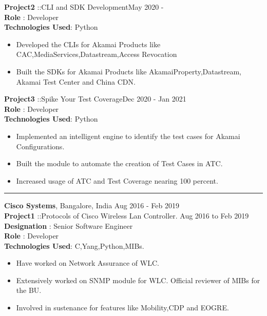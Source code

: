 \documentclass{resumeclass}
\begin{document}
\begin{resume}
  \textbf{Project2} ::CLI and SDK Development\hfill      May 2020 - \\
  \textbf{Role} : Developer \\
  \textbf{Technologies Used}: Python
  
   \begin{itemize} \itemsep -2pt
    \item Developed the CLIs for Akamai Products like CAC,MediaServices,Datastream,Access Revocation
    \item Built the SDKs for Akamai Products like AkamaiProperty,Datastream, Akamai Test Center and China CDN.
  \end{itemize} \vspace{-6pt}

  \textbf{Project3} ::Spike Your Test Coverage\hfill      Dec 2020 - Jan 2021\\
  \textbf{Role} : Developer \\
  \textbf{Technologies Used}: Python
  
   \begin{itemize} \itemsep -2pt
    \item Implemented an intelligent engine to identify the test cases for Akamai Configurations.
    \item Built the module to automate the creation of Test Cases in ATC.
    \item Increased usage of ATC and Test Coverage nearing 100 percent.
  \end{itemize} \vspace{-6pt}

\hfill   
\noindent\rule{20cm}{0.4pt}

{\large \textbf{Cisco Systems}, Bangalore, India} \hfill        Aug 2016 - Feb 2019 \\[0.5pt]

\textbf{Project1} ::Protocols of Cisco Wireless Lan Controller. \hfill      Aug 2016 to Feb 2019 \\
\textbf{Designation} : Senior Software Engineer \\
\textbf{Role} : Developer \\
\textbf{Technologies Used}: C,Yang,Python,MIBs.

 \begin{itemize} \itemsep -2pt
  \item Have worked on Network Assurance of WLC.
  \item Extensively worked on SNMP module for WLC. Official reviewer of MIBs for the BU.
  \item Involved in sustenance for features like Mobility,CDP and EOGRE.
\end{itemize} \vspace{-6pt}



\end{resume}
\end{document}
